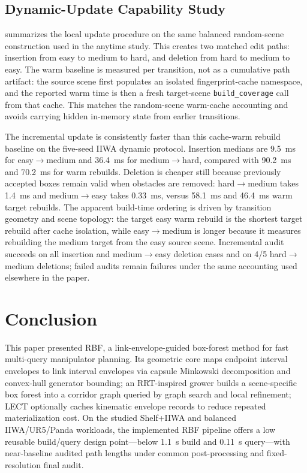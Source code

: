\documentclass[journal]{IEEEtran}
\DeclareRobustCommand{\textsc}[1]{\textnormal{\MakeUppercase{#1}}}
\newcommand{\rbf}{\textsc{RBF}}
\begin{document}
\subsection{Dynamic-Update Capability Study}\label{sec:exp_dynamic_updates}

 summarizes the local update procedure on the
same balanced random-scene construction used in the anytime study. This
creates two matched edit paths: insertion from easy to medium to hard, and
deletion from hard to medium to easy. The warm baseline is measured per
transition, not as a cumulative path artifact: the source scene first populates
an isolated fingerprint-cache namespace, and the reported warm time is then a
fresh target-scene \texttt{build\_coverage} call from that cache. This matches
the random-scene warm-cache accounting and avoids carrying hidden in-memory
state from earlier transitions.



The incremental update is consistently faster than this cache-warm rebuild
baseline on the five-seed IIWA dynamic protocol. Insertion medians are
9.5~ms for easy$\rightarrow$medium and 36.4~ms for
medium$\rightarrow$hard, compared with 90.2~ms and 70.2~ms for warm rebuilds.
Deletion is cheaper still because previously accepted boxes remain valid when
obstacles are removed: hard$\rightarrow$medium takes 1.4~ms and
medium$\rightarrow$easy takes 0.33~ms, versus 58.1~ms and 46.4~ms warm
target rebuilds. The apparent build-time ordering is driven by transition
geometry and scene topology: the target
easy warm rebuild is the shortest target rebuild after cache isolation, while
easy$\rightarrow$medium is longer because it measures rebuilding the medium
target from the easy source scene. Incremental audit succeeds on all insertion
and medium$\rightarrow$easy deletion cases and on 4/5 hard$\rightarrow$medium
deletions; failed audits remain failures under the same accounting used
elsewhere in the paper.

\section{Conclusion}\label{sec:conclusion}

This paper presented \rbf{}, a link-envelope-guided box-forest method for fast
multi-query manipulator planning. Its geometric core maps endpoint interval
envelopes to link interval envelopes via capsule Minkowski decomposition and
convex-hull generator bounding; an RRT-inspired grower builds a scene-specific
box forest into a corridor graph queried by graph search and local refinement;
LECT optionally caches kinematic envelope records to reduce repeated
materialization cost. On the studied Shelf+IIWA and balanced IIWA/UR5/Panda
workloads, the implemented \rbf{} pipeline offers a low reusable build/query
design point---below 1.1~s build and 0.11~s query---with near-baseline audited
path lengths under common post-processing and fixed-resolution final audit.
\end{document}
